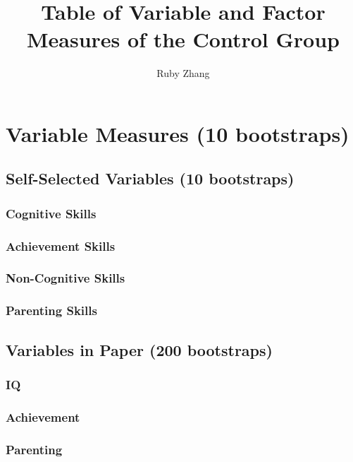 \documentclass[11pt]{article}
\begin{document}
\title{Table of Variable and Factor Measures of the Control Group}
\author{Ruby Zhang}
\maketitle

\section{Variable Measures (10 bootstraps)}

  \subsection{Self-Selected Variables (10 bootstraps)}
    \subsubsection{Cognitive Skills}
    

    \subsubsection{Achievement Skills}
    

    \subsubsection{Non-Cognitive Skills}
    

    \subsubsection{Parenting Skills}
    

  \subsection{Variables in Paper (200 bootstraps)}
    \subsubsection{IQ}
    

    \subsubsection{Achievement}
    

    \subsubsection{Parenting}
    
\end{document}
